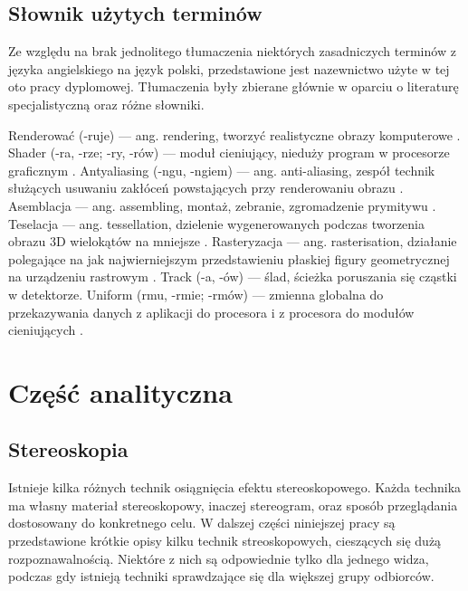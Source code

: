 \subsection{Słownik użytych terminów}
Ze względu na brak jednolitego tłumaczenia niektórych zasadniczych terminów z języka angielskiego na język polski, przedstawione jest nazewnictwo użyte w tej oto pracy dyplomowej. Tłumaczenia były zbierane głównie w oparciu o literaturę specjalistyczną oraz różne słowniki.
\begin{itemize}
\itemi Renderować (-ruje) --- ang. rendering, tworzyć realistyczne obrazy komputerowe \cite{pwn}.
\itemi Shader (-ra, -rze; -ry, -rów) --- moduł cieniujący, nieduży program w procesorze graficznym \cite{slownik}.
\itemi Antyaliasing (-ngu, -ngiem)  --- ang. anti-aliasing, zespół technik służących usuwaniu zakłóceń powstających przy renderowaniu obrazu \cite{wprowadzeniedografiki}.
\itemi Asemblacja --- ang. assembling, montaż, zebranie, zgromadzenie prymitywu \cite{slownik}.
\itemi Teselacja --- ang. tessellation, dzielenie wygenerowanych podczas tworzenia obrazu 3D wielokątów na mniejsze \cite{slownik}.
\itemi Rasteryzacja --- ang. rasterisation, działanie polegające na jak najwierniejszym przedstawieniu płaskiej figury geometrycznej na urządzeniu rastrowym \cite{slownik}.
\itemi Track (-a, -ów) --- ślad, ścieżka poruszania się cząstki w detektorze.
\itemi Uniform (rmu, -rmie; -rmów) --- zmienna globalna do przekazywania danych z aplikacji do procesora i z procesora do modułów cieniujących \cite{slownik}.
\end{itemize}

\newpage
\section[Część analityczna]{Część analityczna}
\subsection{Stereoskopia}
Istnieje kilka różnych technik osiągnięcia efektu stereoskopowego. Każda technika ma własny materiał stereoskopowy, inaczej stereogram, oraz sposób przeglądania dostosowany do konkretnego celu. W dalszej części niniejszej pracy są przedstawione krótkie opisy kilku technik streoskopowych, cieszących się dużą rozpoznawalnością. Niektóre z nich są odpowiednie tylko dla jednego widza, podczas gdy istnieją techniki sprawdzające się dla większej grupy odbiorców.

